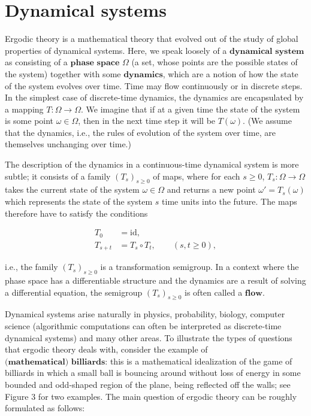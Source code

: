 \documentclass[11pt]{report}
\theoremstyle{plain}
\theoremstyle{definition}
\begin{document}
\chapter{Dynamical systems}
Ergodic theory is a mathematical theory that evolved out of the study of global properties of dynamical systems. Here, we speak loosely of a $\textbf{dynamical system}$ as consisting of a $\textbf{phase space}$ $\Omega$ (a set, whose points are the possible states of the system) together with some $\textbf{dynamics}$, which are a notion of how the state of the system evolves over time. Time may flow continuously or in discrete steps. In the simplest case of discrete-time dynamics, the dynamics are encapsulated by a mapping $T:\Omega\to \Omega$. We imagine that if at a given time the state of the system is some point $\omega \in \Omega$, then in the next time step it will be $T(\omega)$. (We assume that the dynamics, i.e., the rules of evolution of the system over time, are themselves unchanging over time.)

The description of the dynamics in a continuous-time dynamical system is more subtle; it consists of a family $(T_s)_{s\ge 0}$ of maps, where for each $s\ge 0$, $T_s:\Omega\to \Omega$ takes the current state of the system $\omega\in \Omega$ and returns a new point $\omega'=T_s(\omega)$ which represents the state of the system $s$ time units into the future. The maps therefore have to satisfy the conditions

\begin{align*}
T_0 &= \textrm{id}, \\
T_{s+t} &= T_s \circ T_t, \qquad (s,t\ge 0),
\end{align*}

i.e., the family $(T_s)_{s\ge 0}$ is a transformation semigroup. In a context where the phase space has a differentiable structure and the dynamics are a result of solving a differential equation, the semigroup $(T_s)_{s\ge0}$ is often called a $\textbf{flow}$.

Dynamical systems arise naturally in physics, probability, biology, computer science (algorithmic computations can often be interpreted as discrete-time dynamical systems) and many other areas. To illustrate the types of questions that ergodic theory deals with, consider the example of $\textbf{(mathematical) billiards}$: this is a mathematical idealization of the game of billiards in which a small ball is bouncing around without loss of energy in some bounded and odd-shaped region of the plane, being reflected off the walls; see Figure 3 for two examples. The main question of ergodic theory can be roughly formulated as follows:
\end{document}

